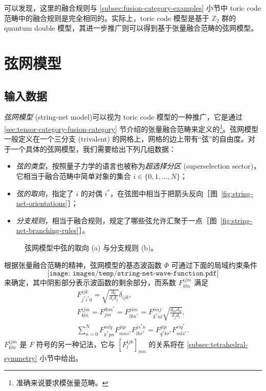 可以发现，这里的融合规则与 \ref{subsec:fusion-category-examples} 小节中 toric code 范畴中的融合规则是完全相同的。实际上，toric code 模型是基于 $\mathbb{Z}_2$ 群的 quantum double 模型，其进一步推广则可以得到基于张量融合范畴的弦网模型。

\section{弦网模型}

\subsection{输入数据}

\emph{弦网模型} (string-net model)\cite{levin2005string,levin2006detecting}可以视为 toric code 模型的一种推广，它是通过 \ref{sec:tensor-category-fusion-category} 节介绍的张量融合范畴来定义的\footnote{准确来说要求模张量范畴。}。弦网模型一般定义在一个三分支 (trivalent) 的网格上，网格的边上带有“弦”的自由度。对于一个具体的弦网模型，我们需要给出下列几组数据：
\begin{itemize}
  \item \emph{弦的类型}，按照量子力学的语言也被称为\emph{超选择分区} (superselection sector)，它相当于融合范畴中简单对象的集合 $i\in\{0,1,\dots,N\}$；
  \item \emph{弦的取向}，指定了 $i$ 的对偶 $i^*$，在弦图中相当于把箭头反向［图~\ref{fig:string-net-orientations}］；
  \item \emph{分支规则}，相当于融合规则，规定了哪些弦允许汇聚于一点［图~\ref{fig:string-net-branching-rules}］。
\end{itemize}

\begin{figure}[htb]
  \centering
   \qquad
  \caption[弦网模型中弦的取向与分支规则]{弦网模型中弦的取向 (a) 与分支规则 (b)。}
\end{figure}

根据张量融合范畴的精神，弦网模型的基态波函数 $\Phi$ 可通过下面的局域约束条件\cite{levin2005string}
\begin{equation}
  \texttt{[image: images/temp/string-net-wave-function.pdf]}
  \label{eq:string-net-local-rules}
\end{equation}
来确定，其中阴影部分表示波函数的剩余部分，而系数 $F^{ijm}_{kln}$ 满足
\begin{equation}
  \begin{gathered}
    F^{ijk}_{j^* i^* 0} = \sqrt{\frac{d_k}{d_i d_j}} \delta_{ijk}, \\
    F^{ijm}_{kln} = F^{lkm^*}_{jin} = F^{jim}_{lkn^*} = F^{imj}_{k^* nl} \sqrt{\frac{d_m d_n}{d_j d_l}}, \\
    \sum_{n=0}^N F^{mlq}_{k^*p n} F^{jip}_{mns^*} F^{js^* n}_{lkr^*} = F^{jip}_{q^* kr^*} F^{riq^*}_{mls^*}.
  \end{gathered}
\end{equation}
$F^{ijm}_{kln}$ 是 $F$ 符号的另一种记法，它与 $[F^{ijk}_l]_{mn}$ 的关系将在 \ref{subsec:tetrahedral-symmetry} 小节中给出。


